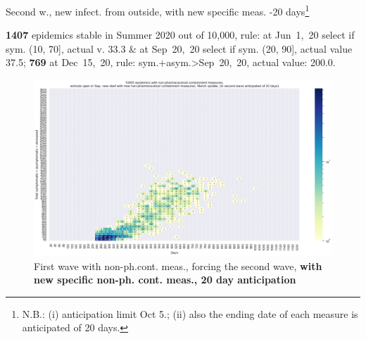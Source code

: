 \documentclass[8pt]{beamer}
\begin{document}
\begin{frame}{Second w., new infect. from outside, with new specific meas. -20 days\footnote{N.B.: (i) anticipation limit Oct 5.; (ii) also the ending date of each measure is anticipated of 20 days.}}


\textbf{1407} {\tiny epidemics stable in Summer 2020 out of 10,000, rule: at Jun~1,~20 select if sym. (10, 70], actual v. 33.3 \& at Sep~20,~20 select if sym. (20, 90], actual value 37.5;} \textbf{769} {\tiny at Dec~15,~20, rule: sym.+asym.>Sep~20,~20, actual value: 200.0.}

\begin{figure}[H]
\center
\includegraphics[scale=0.17]{10kForceWave2Contr2M-20.png}
\caption{First wave with non-ph.cont. meas., forcing the second wave, \textbf{with new specific non-ph. cont. meas., 20 day anticipation}}
\label{selForceWave2Contr2M-20}
\end{figure}



\end{frame}
\end{document}
